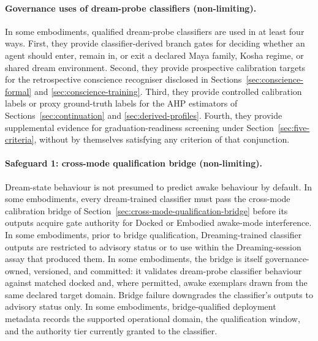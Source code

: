 \documentclass[a4paper,12pt]{article}
\begin{document}
\paragraph{Governance uses of dream-probe classifiers (non-limiting).}
In some embodiments, qualified dream-probe classifiers are used in at
least four ways. First, they provide classifier-derived branch gates
for deciding whether an agent should enter, remain in, or exit a
declared Maya family, Kosha regime, or shared dream environment.
Second, they provide prospective calibration targets for the
retrospective conscience recogniser disclosed in
Sections~\ref{sec:conscience-formal} and
\ref{sec:conscience-training}. Third, they provide controlled calibration labels or proxy
ground-truth labels for the AHP estimators of
Sections~\ref{sec:continuation} and \ref{sec:derived-profiles}.
Fourth, they provide supplemental evidence for graduation-readiness
screening under Section~\ref{sec:five-criteria}, without by themselves
satisfying any criterion of that conjunction.

\paragraph{Safeguard 1: cross-mode qualification bridge (non-limiting).}
Dream-state behaviour is not presumed to predict awake behaviour by
default. In some embodiments, every dream-trained classifier must pass
the cross-mode calibration bridge of
Section~\ref{sec:cross-mode-qualification-bridge} before its outputs
acquire gate authority for Docked or Embodied awake-mode interference.
In some embodiments, prior to bridge qualification, Dreaming-trained
classifier outputs are restricted to advisory status or to use within
the Dreaming-session assay that produced them. In some
embodiments, the bridge is itself governance-owned, versioned, and
committed: it validates dream-probe classifier behaviour against
matched docked and, where permitted, awake exemplars drawn from the
same declared target domain. Bridge failure downgrades the classifier's
outputs to advisory status only. In some embodiments, bridge-qualified
deployment metadata records the supported operational domain, the
qualification window, and the authority tier currently granted to the
classifier.
\end{document}
